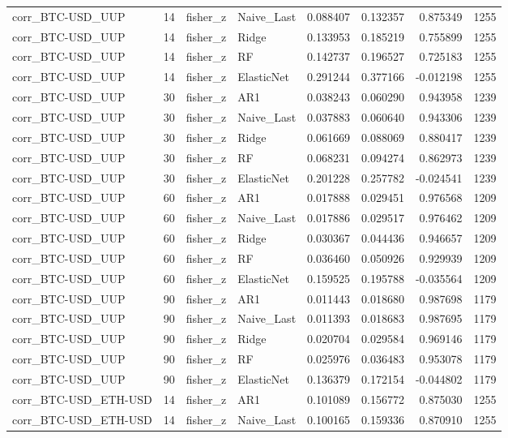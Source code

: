 \begin{table}
\begin{tabular}{lrllrrrr}
corr_BTC-USD_UUP & 14 & fisher_z & Naive_Last & 0.088407 & 0.132357 & 0.875349 & 1255 \\
corr_BTC-USD_UUP & 14 & fisher_z & Ridge & 0.133953 & 0.185219 & 0.755899 & 1255 \\
corr_BTC-USD_UUP & 14 & fisher_z & RF & 0.142737 & 0.196527 & 0.725183 & 1255 \\
corr_BTC-USD_UUP & 14 & fisher_z & ElasticNet & 0.291244 & 0.377166 & -0.012198 & 1255 \\
corr_BTC-USD_UUP & 30 & fisher_z & AR1 & 0.038243 & 0.060290 & 0.943958 & 1239 \\
corr_BTC-USD_UUP & 30 & fisher_z & Naive_Last & 0.037883 & 0.060640 & 0.943306 & 1239 \\
corr_BTC-USD_UUP & 30 & fisher_z & Ridge & 0.061669 & 0.088069 & 0.880417 & 1239 \\
corr_BTC-USD_UUP & 30 & fisher_z & RF & 0.068231 & 0.094274 & 0.862973 & 1239 \\
corr_BTC-USD_UUP & 30 & fisher_z & ElasticNet & 0.201228 & 0.257782 & -0.024541 & 1239 \\
corr_BTC-USD_UUP & 60 & fisher_z & AR1 & 0.017888 & 0.029451 & 0.976568 & 1209 \\
corr_BTC-USD_UUP & 60 & fisher_z & Naive_Last & 0.017886 & 0.029517 & 0.976462 & 1209 \\
corr_BTC-USD_UUP & 60 & fisher_z & Ridge & 0.030367 & 0.044436 & 0.946657 & 1209 \\
corr_BTC-USD_UUP & 60 & fisher_z & RF & 0.036460 & 0.050926 & 0.929939 & 1209 \\
corr_BTC-USD_UUP & 60 & fisher_z & ElasticNet & 0.159525 & 0.195788 & -0.035564 & 1209 \\
corr_BTC-USD_UUP & 90 & fisher_z & AR1 & 0.011443 & 0.018680 & 0.987698 & 1179 \\
corr_BTC-USD_UUP & 90 & fisher_z & Naive_Last & 0.011393 & 0.018683 & 0.987695 & 1179 \\
corr_BTC-USD_UUP & 90 & fisher_z & Ridge & 0.020704 & 0.029584 & 0.969146 & 1179 \\
corr_BTC-USD_UUP & 90 & fisher_z & RF & 0.025976 & 0.036483 & 0.953078 & 1179 \\
corr_BTC-USD_UUP & 90 & fisher_z & ElasticNet & 0.136379 & 0.172154 & -0.044802 & 1179 \\
corr_BTC-USD_ETH-USD & 14 & fisher_z & AR1 & 0.101089 & 0.156772 & 0.875030 & 1255 \\
corr_BTC-USD_ETH-USD & 14 & fisher_z & Naive_Last & 0.100165 & 0.159336 & 0.870910 & 1255 \\

\end{tabular}
\end{table}
